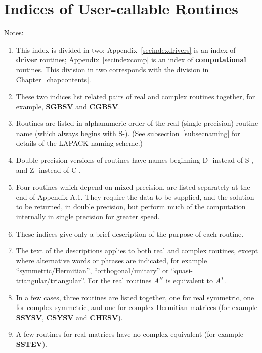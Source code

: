 \chapter{Indices of User-callable Routines}\label{chapindexuser}

Notes:

\begin{enumerate}

\item This index is divided in two: Appendix~\ref{secindexdrivers} is an index of {\bf driver} routines;
Appendix~\ref{secindexcomp}  is an index of {\bf computational} routines. This division in two
corresponds with the division in Chapter~\ref{chapcontents}.

\item These two indices list related pairs of real and complex routines together,
for example, {\bf SGBSV} and {\bf CGBSV}. 

\item Routines are listed in alphanumeric order
of the real (single precision) routine name (which always begins with S-).
(See subsection~\ref{subsecnaming} for details of the LAPACK naming scheme.)

\item Double precision versions of routines have names beginning
D- instead of S-, and Z- instead of C-.

\item Four routines which depend on mixed precision, are listed separately at the end of
Appendix A.1. They require the data to be supplied, and the solution to be returned, in
double precision, but perform much of the computation internally in single precision
for greater speed.

\item These indices give only a brief description of the purpose of each
routine.

\item The text of the descriptions applies to both real and complex routines,
except where alternative words or phrases are indicated, for example
``symmetric/Hermitian'', ``orthogonal/unitary''
or ``quasi-triangular/triangular''. For the real routines $A^H$ is equivalent
to $A^T$.

\item In a few cases, three routines are listed together, one for
real symmetric, one for complex symmetric, and one for complex Hermitian
matrices (for example {\bf SSYSV}, {\bf CSYSV} and {\bf CHESV}). 

\item A few routines for real matrices have no complex equivalent (for example
{\bf SSTEV}).

\end{enumerate}

